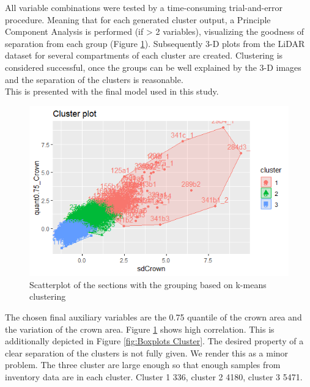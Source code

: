 All variable combinations were tested by a time-consuming trial-and-error procedure. Meaning that for each
generated cluster output, a Principle Component Analysis is performed (if > 2 variables), visualizing the goodness
of separation from each group (Figure \ref{fig:Clusterplot}). Subsequently 3-D plots from the LiDAR dataset for
several compartments of each cluster are created. Clustering is considered successful, once the groups can be well
explained by the 3-D images and the separation of the clusters is reasonable.\\
This is presented with the final model used in this study.\\

\begin{figure}[H]
\centering
  \includegraphics[scale = 0.85]{clusterplot.png}
  \caption{Scatterplot of the sections with the grouping based on k-means clustering}
  \label{fig:Clusterplot}
\end{figure}

The chosen final auxiliary variables are the 0.75 quantile of the crown area and the variation of the crown area.
Figure \ref{fig:Clusterplot} shows high correlation. This is additionally depicted in Figure \ref{fig:Boxplots Cluster}. The desired property of a clear separation of the clusters is not fully given. We render this as a
minor problem. The three cluster are large enough so that enough samples from inventory data are in each
cluster. Cluster 1 336, cluster 2 4180, cluster 3 5471.\\


